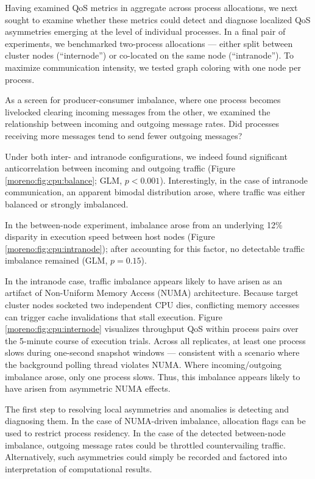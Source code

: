 Having examined QoS metrics in aggregate across process allocations, we next sought to examine whether these metrics could detect and diagnose localized QoS asymmetries emerging at the level of individual processes.
In a final pair of experiments, we benchmarked two-process allocations --- either split between cluster nodes (``internode'') or co-located on the same node (``intranode'').
To maximize communication intensity, we tested graph coloring with one node per process.

As a screen for producer-consumer imbalance, where one process becomes livelocked clearing incoming messages from the other, we examined the relationship between incoming and outgoing message rates.
Did processes receiving more messages tend to send fewer outgoing messages?

Under both inter- and intranode configurations, we indeed found significant anticorrelation between incoming and outgoing traffic (Figure \ref{moreno:fig:cpu:balance}; GLM, $p < 0.001$).
Interestingly, in the case of intranode communication, an apparent bimodal distribution arose, where traffic was either balanced or strongly imbalanced.

In the between-node experiment, imbalance arose from an underlying 12\% disparity in execution speed between host nodes (Figure \ref{moreno:fig:cpu:intranode}); after accounting for this factor, no detectable traffic imbalance remained (GLM, $p = 0.15$).

In the intranode case, traffic imbalance appears likely to have arisen as an artifact of Non-Uniform Memory Access (NUMA) architecture.
Because target cluster nodes socketed two independent CPU dies, conflicting memory accesses can trigger cache invalidations that stall execution.
Figure \ref{moreno:fig:cpu:internode} visualizes throughput QoS within process pairs over the 5-minute course of execution trials.
Across all replicates, at least one process slows during one-second snapshot windows --- consistent with a scenario where the background polling thread violates NUMA.
Where incoming/outgoing imbalance arose, only one process slows.
Thus, this imbalance appears likely to have arisen from asymmetric NUMA effects.

The first step to resolving local asymmetries and anomalies is detecting and diagnosing them.
In the case of NUMA-driven imbalance, allocation flags can be used to restrict process residency.
In the case of the detected between-node imbalance, outgoing message rates could be throttled countervailing traffic.
Alternatively, such asymmetries could simply be recorded and factored into interpretation of computational results.
